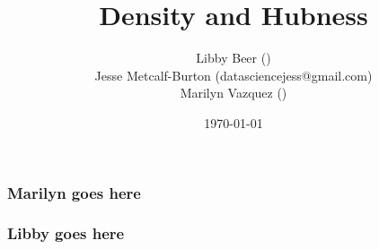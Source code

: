 \documentclass{beamer}
\title[Hubness]{Density and Hubness} %
\author{Libby Beer ()\\
Jesse Metcalf-Burton (datasciencejess@gmail.com)\\
Marilyn Vazquez ()} %
\date{\today} %
\begin{document}
\begin{frame}
\titlepage %
\end{frame}





\begin{frame}
\frametitle{Marilyn goes here}

\end{frame}


\begin{frame}
\frametitle{Libby goes here}

\end{frame}
\end{document}
